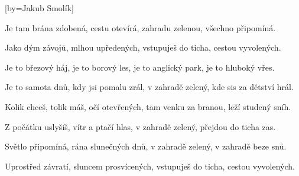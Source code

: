 [by={Jakub Smolík}]

\beginverse{}
Je tam brána zdobená, cestu otevírá,
zahradu zelenou, všechno připomíná.
\endverse{}

\beginverse{}
\chordsoff{}
Jako dým závojů, mlhou upředených,
vstupuješ do ticha, cestou vyvolených.
\chordson{}
\endverse{}

\beginverse{}
\chordsoff{}
Je to březový háj, je to borový les,
je to anglický park, je to hluboký vřes.
\chordson{}
\endverse{}

\beginverse{}
\chordsoff{}
Je to samota dnů, kdy jsi pomalu zrál,
v zahradě zelený, kde sis za dětství hrál.
\chordson{}
\endverse{}

\beginverse{}
\chordsoff{}
Kolik chceš, tolik máš, očí otevřených,
tam venku za branou, leží studený sníh.
\chordson{}
\endverse{}

\beginverse{}
\chordsoff{}
Z počátku uslyšíš, vítr a ptačí hlas,
v zahradě zelený, přejdou do ticha zas.
\chordson{}
\endverse{}

\beginverse{}
\chordsoff{}
Světlo připomíná, rána slunečných dnů,
v zahradě zelený, v zahradě beze snů.
\chordson{}
\endverse{}

\beginverse{}
\chordsoff{}
Uprostřed závratí, sluncem prosvícených,
vstupuješ do ticha, cestou vyvolených.
\chordson{}
\endverse{}

\endsong{}

